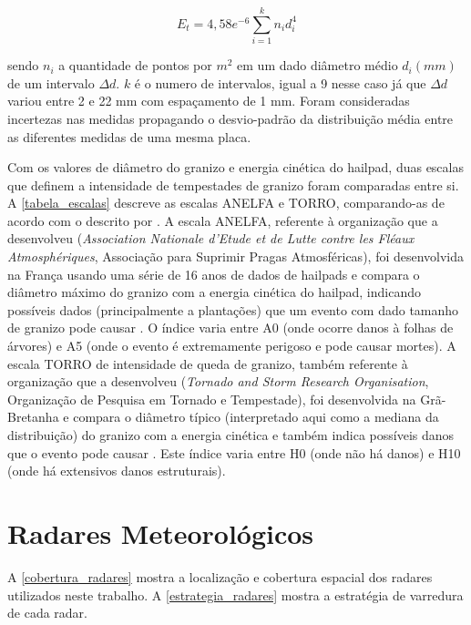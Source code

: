 \begin{equation}
	E_t = 4,58 e^{-6} \sum_{i=1}^{k} n_i d_i^4
\end{equation}

\noindent
sendo $n_i$ a quantidade de pontos por $m^2$ em um dado diâmetro médio $d_i (mm)$ de um intervalo $\Delta d$. $k$ é o numero de intervalos, igual a 9 nesse caso já que $\Delta d$ variou entre 2 e 22 mm com espaçamento de 1 mm. Foram consideradas incertezas nas medidas propagando o desvio-padrão da distribuição média entre as diferentes medidas de uma mesma placa.

Com os valores de diâmetro do granizo e energia cinética do hailpad, duas escalas que definem a intensidade de tempestades de granizo foram comparadas entre si. A \autoref{tabela_escalas} descreve as escalas ANELFA e TORRO, comparando-as de acordo com o descrito por . A escala ANELFA, referente à organização que a desenvolveu (\textit{Association Nationale d’Etude et de Lutte contre les Fléaux Atmosphériques}, Associação para Suprimir Pragas Atmosféricas), foi desenvolvida na França usando uma série de 16 anos de dados de hailpads e compara o diâmetro máximo do granizo com a energia cinética do hailpad, indicando possíveis dados (principalmente a plantações) que um evento com dado tamanho de granizo pode causar \cite{Dessens2007}. O índice varia entre A0 (onde ocorre danos à folhas de árvores) e A5 (onde o evento é extremamente perigoso e pode causar mortes). A escala TORRO de intensidade de queda de granizo, também referente à organização que a desenvolveu (\textit{Tornado and Storm Research Organisation}, Organização de Pesquisa em Tornado e Tempestade), foi desenvolvida na Grã-Bretanha e compara o diâmetro típico (interpretado aqui como a mediana da distribuição) do granizo com a energia cinética e também indica possíveis danos que o evento pode causar \cite{webb1986}. Este índice varia entre H0 (onde não há danos) e H10 (onde há extensivos danos estruturais).



\section{Radares Meteorológicos}\label{radar}

A \autoref{cobertura_radares} mostra a localização e cobertura espacial dos radares utilizados neste trabalho. A \autoref{estrategia_radares} mostra a estratégia de varredura de cada radar.

